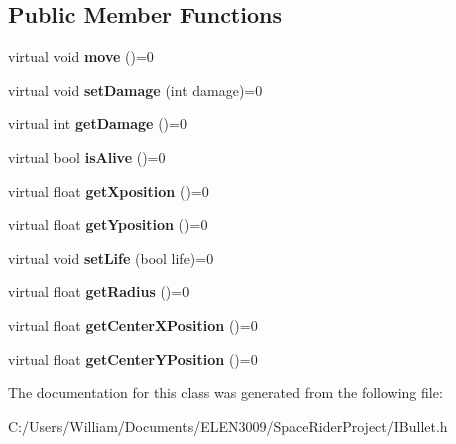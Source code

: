 \subsection*{Public Member Functions}
\begin{DoxyCompactItemize}
\item 
\mbox{\label{class_i_bullet_a0884074f0bc793fb5a52ac33842622fd}} 
virtual void {\bfseries move} ()=0
\item 
\mbox{\label{class_i_bullet_a072298555accb47f11b84f4c781ae876}} 
virtual void {\bfseries set\+Damage} (int damage)=0
\item 
\mbox{\label{class_i_bullet_ab6643a4ad3888ee4ebfbc3d445c4b73d}} 
virtual int {\bfseries get\+Damage} ()=0
\item 
\mbox{\label{class_i_bullet_ac1252496738126ec94a97512011b9112}} 
virtual bool {\bfseries is\+Alive} ()=0
\item 
\mbox{\label{class_i_bullet_a20babdd6c657ddda175e84a56564dcfa}} 
virtual float {\bfseries get\+Xposition} ()=0
\item 
\mbox{\label{class_i_bullet_a36594de9a0c0ddd7083bca10ef5d8332}} 
virtual float {\bfseries get\+Yposition} ()=0
\item 
\mbox{\label{class_i_bullet_abf99befdaa121e7c9ca2acc2ed75b513}} 
virtual void {\bfseries set\+Life} (bool life)=0
\item 
\mbox{\label{class_i_bullet_a327968e71126cdea5998076d8919354f}} 
virtual float {\bfseries get\+Radius} ()=0
\item 
\mbox{\label{class_i_bullet_a43a43e2df81e05a03be42d9025e6dd2a}} 
virtual float {\bfseries get\+Center\+X\+Position} ()=0
\item 
\mbox{\label{class_i_bullet_a8245ed2bc72beed1d69547ce5f87a021}} 
virtual float {\bfseries get\+Center\+Y\+Position} ()=0
\end{DoxyCompactItemize}


The documentation for this class was generated from the following file\+:\begin{DoxyCompactItemize}
\item 
C\+:/\+Users/\+William/\+Documents/\+E\+L\+E\+N3009/\+Space\+Rider\+Project/I\+Bullet.\+h\end{DoxyCompactItemize}
